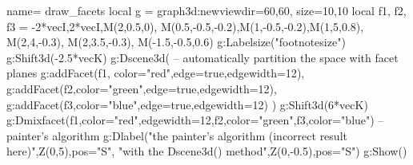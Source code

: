 \documentclass[border=5pt]{standalone}%
\begin{document}
\begin{luadraw}{name= draw_facets}
local g = graph3d:new{viewdir={60,60}, size={10,10}}
local f1, f2, f3 = {-2*vecI,2*vecI,M(2,0.5,0)}, {M(0.5,-0.5,-0.2),M(1,-0.5,-0.2),M(1,5,0.8)}, {M(2,4,-0.3), M(2,3.5,-0.3), M(-1.5,-0.5,0.6)}
g:Labelsize("footnotesize")
g:Shift3d(-2.5*vecK)
g:Dscene3d( -- automatically partition the space with facet planes
    g:addFacet(f1, {color="red",edge=true,edgewidth=12}), 
    g:addFacet(f2,{color="green",edge=true,edgewidth=12}), 
    g:addFacet(f3,{color="blue",edge=true,edgewidth=12}) )
g:Shift3d(6*vecK)
g:Dmixfacet(f1,{color="red",edgewidth=12},f2,{color="green"},f3,{color="blue"}) --painter's algorithm
g:Dlabel("the painter's algorithm (incorrect result here)",Z(0,5),{pos="S"},
"with the Dscene3d() method",Z(0,-0.5),{pos="S"})
g:Show() 
\end{luadraw}
\end{document}
